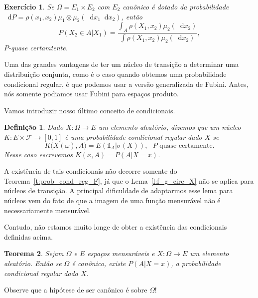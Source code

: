\documentclass[reqno, draft]{book}
\newcommand*\1{\mathds{1}}
\newtheorem{theorem}{Teorema}[section]
\newtheorem{definition}[theorem]{Definição}
\newtheorem{exercise}[example]{Exercício}
\renewcommand*\d{\mathop{}\!\mathrm{d}}
\begin{document}
\begin{exercise}
  Se $\Omega = E_1 \times E_2$ com $E_2$ canônico é dotado da probabilidade $\d P = \rho(x_1, x_2) \mu_1 \otimes \mu_2 (\d x_1 \d x_2)$, então
  \begin{equation}
    P(X_2 \in A|X_1) = \frac{\int_A \rho(X_1, x_2) \mu_2(\d x_2)}{\int \rho(X_1, x_2) \mu_2(\d x_2)},
  \end{equation}
  $P$-quase certamtente.
\end{exercise}

Uma das grandes vantagens de ter um núcleo de transição a determinar uma distribuição conjunta, como é o caso quando obtemos uma probabilidade condicional regular, é que podemos usar a versão generalizada de Fubini.
Antes, nós somente podiamos usar Fubini para espaços produto.

Vamos introduzir nosso último conceito de condicionais.

\begin{definition}
  Dado $X:\Omega \to E$ um elemento aleatório, dizemos que um núcleo $K: E \times \mathcal{F} \to [0,1]$ é uma \emph{probabilidade condicional regular dado $X$} se
  \begin{equation}
    \label{e:K_prob_cond_reg_X}
    K\big( X(\omega), A\big) = E(\1_A|\sigma(X)), \text{ $P$-quase certamente.}
  \end{equation}
  Nesse caso escrevemos $K(x, A) = P(A|X = x)$.
\end{definition}

A existência de tais condicionais não decorre somente do Teorema~\ref{t:prob_cond_reg_F}, já que o Lema~\ref{l:f_g_circ_X} não se aplica para núcleos de transição.
A principal dificuldade de adaptarmos esse lema para núcleos vem do fato de que a imagem de uma função mensurável não é necessariamente mensurável.

Contudo, não estamos muito longe de obter a existência das condicionais definidas acima.

\begin{theorem}
  \label{t:prob_cond_reg_X}
  Sejam $\Omega$ e $E$ espaços mensuráveis e $X: \Omega \to E$ um elemento aleatório.
  Então se $\Omega$ é canônico, existe $P(A|X = x)$, a probabilidade condicional regular dada $X$.
\end{theorem}

Observe que a hipótese de ser canônico é sobre $\Omega$!
\end{document}
